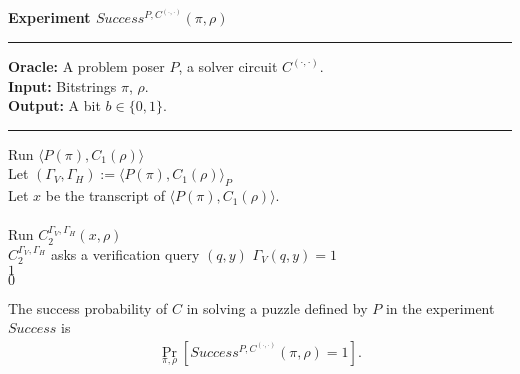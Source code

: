 \begin{codeblock}
  \textbf{Experiment $Success^{P, C^{(\cdot, \cdot)}}(\pi, \rho) $}
  \medskip
  \hrule
  \medskip
  \textbf{Oracle:} A problem poser $P$, a solver circuit $C^{(\cdot,\cdot)}$.\\
  \textbf{Input:}  Bitstrings $\pi$, $\rho$.\\
  \textbf{Output:} A bit $b \in \{0,1\}$.
  \medskip\hrule\medskip
  Run $\langle P(\pi), C_1(\rho) \rangle$ \\
  \IndI Let $(\Gamma_V, \Gamma_H) := \langle P(\pi), C_1(\rho) \rangle_{P}$ \\
  \IndI Let $x$ be the transcript of $\langle P(\pi), C_1(\rho) \rangle$. \\ \\
  Run $C_2^{\Gamma_V,\Gamma_H}(x, \rho)$ \\
  \IndI \If $C_2^{\Gamma_V, \Gamma_H}$ asks a verification query $(q, y)$ \And $\Gamma_V(q, y) = 1$ \then \\
  \IndII \return $1$ \\
  \return $0$ \\
\end{codeblock}
%
The success probability of $C$ in solving a puzzle defined by $P$ in the experiment $Success$ is
\begin{align}
 \underset{\pi, \rho}{\Pr}[Success^{P,C^{(\cdot, \cdot)}}(\pi, \rho) = 1].
\end{align}
%
